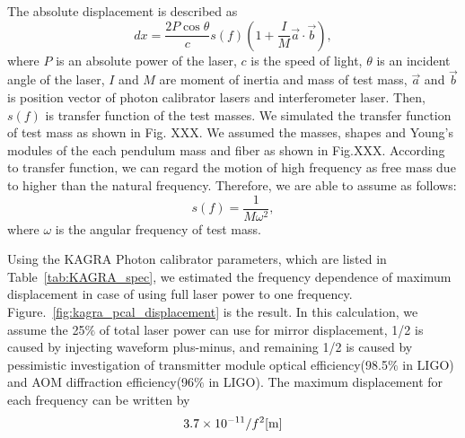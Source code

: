 
The absolute displacement is described as
\begin{equation}
dx=\frac{2 P \cos{\theta}}{c} s(f) \left( 1+\frac{I}{M}\vec{a}\cdot \vec{b}\right), \label{eq:dx}
\end{equation}
where $P$ is an absolute power of the laser, $c$ is the speed of light, $\theta$  is an incident angle of the laser, $I$ and $M$ are moment of inertia and mass of test mass, $\vec{a}$ and $\vec{b}$ is position vector of photon calibrator lasers and interferometer laser. Then, $s(f)$ is transfer function of the test masses. We simulated the transfer function of test mass as shown in Fig. XXX. We assumed the masses, shapes and Young's modules of the each pendulum mass and fiber as shown in Fig.XXX. According to transfer function, we can regard the motion of high frequency as free mass due to higher than the natural frequency. Therefore, we are able to assume as follows:
\begin{equation}
s(f)=\frac{1}{M \omega^2},
\end{equation}
where $\omega$ is the angular frequency of test mass.

Using the KAGRA Photon calibrator parameters, which are listed in Table~\ref{tab:KAGRA_spec}, we estimated the frequency dependence of maximum displacement 
in case of using full laser power to one frequency. 
Figure.~\ref{fig:kagra_pcal_displacement} is the result.
In this calculation, we assume the 25$\%$ of total laser power can use for mirror displacement, 
1/2 is caused by injecting waveform plus-minus, 
and remaining 1/2 is caused by pessimistic investigation of 
transmitter module optical efficiency(98.5$\%$ in LIGO) and
AOM diffraction efficiency(96$\%$ in LIGO).
The maximum displacement for each frequency can be written by 
\begin{equation}
3.7 \times 10^{-11}/f^2 {\rm   [m]}
\end{equation}

